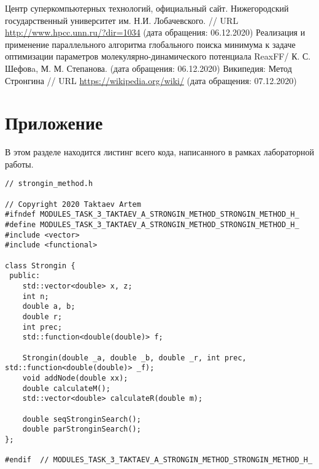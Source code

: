 \documentclass{report}
\begin{document}
\begin{thebibliography}{1}
 Центр суперкомпьютерных технологий, официальный сайт. Нижегородский
государственный университет им. Н.И. Лобачевского.  // URL \url {http://www.hpcc.unn.ru/?dir=1034} (дата обращения: 06.12.2020)
 Реализация и применение параллельного алгоритма глобального поиска минимума к задаче оптимизации параметров молекулярно-динамического потенциала ReaxFF/ К. С. Шефовa, М. М. Степанова. (дата обращения: 06.12.2020)
 Википедия: Метод Стронгина // URL \url {https://wikipedia.org/wiki/} (дата обращения: 07.12.2020)
\end{thebibliography}
\newpage

\section*{Приложение}
В этом разделе находится листинг всего кода, написанного в рамках лабораторной работы.
\begin{lstlisting}
// strongin_method.h

// Copyright 2020 Taktaev Artem
#ifndef MODULES_TASK_3_TAKTAEV_A_STRONGIN_METHOD_STRONGIN_METHOD_H_
#define MODULES_TASK_3_TAKTAEV_A_STRONGIN_METHOD_STRONGIN_METHOD_H_
#include <vector>
#include <functional>

class Strongin {
 public:
    std::vector<double> x, z;
    int n;
    double a, b;
    double r;
    int prec;
    std::function<double(double)> f;

    Strongin(double _a, double _b, double _r, int prec, std::function<double(double)> _f);
    void addNode(double xx);
    double calculateM();
    std::vector<double> calculateR(double m);

    double seqStronginSearch();
    double parStronginSearch();
};

#endif  // MODULES_TASK_3_TAKTAEV_A_STRONGIN_METHOD_STRONGIN_METHOD_H_

\end{lstlisting}
\end{document}
